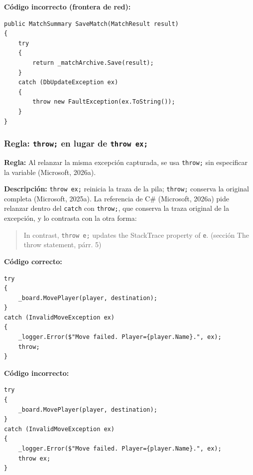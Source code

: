 \textbf{Código incorrecto (frontera de red):}
\begin{lstlisting}[style=csharpstyle]
public MatchSummary SaveMatch(MatchResult result)
{
    try
    {
        return _matchArchive.Save(result);
    }
    catch (DbUpdateException ex)
    {
        throw new FaultException(ex.ToString());
    }
}
\end{lstlisting}

\subsubsection{Regla: \texttt{throw;} en lugar de \texttt{throw ex;}}

\textbf{Regla:} Al relanzar la misma excepción capturada, se usa \texttt{throw;} sin especificar la variable (Microsoft, 2026a).

\textbf{Descripción:} \texttt{throw ex;} reinicia la traza de la pila; \texttt{throw;} conserva la original completa (Microsoft, 2025a). La referencia de C\# (Microsoft, 2026a) pide relanzar dentro del \texttt{catch} con \texttt{throw;}, que conserva la traza original de la excepción, y lo contrasta con la otra forma:
\begin{quote}
In contrast, \texttt{throw e;} updates the StackTrace property of \texttt{e}. (sección The throw statement, párr. 5)
\end{quote}

\textbf{Código correcto:}
\begin{lstlisting}[style=csharpstyle]
try
{
    _board.MovePlayer(player, destination);
}
catch (InvalidMoveException ex)
{
    _logger.Error($"Move failed. Player={player.Name}.", ex);
    throw;
}
\end{lstlisting}

\textbf{Código incorrecto:}
\begin{lstlisting}[style=csharpstyle]
try
{
    _board.MovePlayer(player, destination);
}
catch (InvalidMoveException ex)
{
    _logger.Error($"Move failed. Player={player.Name}.", ex);
    throw ex;
}
\end{lstlisting}
